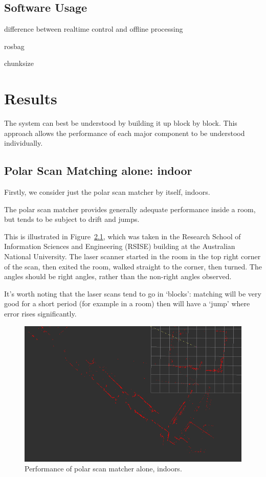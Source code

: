 \documentclass[12pt,oneside,a4paper]{book}
\begin{document}
\section{Software Usage}
\label{sec:software-usage}

difference between realtime control and offline processing

rosbag

chunksize

\chapter{Results}
\label{cha:results}

The system can best be understood by building it up block by
block. This approach allows the performance of each major component to
be understood individually.

\section{Polar Scan Matching alone: indoor}
\label{sec:psm-indoor}

Firstly, we consider just the polar scan matcher by itself, indoors.

The polar scan matcher provides generally adequate performance inside
a room, but tends to be subject to drift and jumps. 

This is illustrated in Figure~\ref{fig:psm-indoors}, which was taken
in the Research School of Information Sciences and Engineering (RSISE)
building at the Australian National University. The laser scanner
started in the room in the top right corner of the scan, then exited
the room, walked straight to the corner, then turned. The angles
should be right angles, rather than the non-right angles observed.

It's worth noting that the laser scans tend to go in `blocks':
matching will be very good for a short period (for example in a room)
then will have a `jump' where error rises significantly.

\begin{figure}[h!]
  \centering
  \includegraphics[width=\textwidth]{figs/indoor}
  \caption{Performance of polar scan matcher alone, indoors.}
  \label{fig:psm-indoors}
\end{figure}
\end{document}

